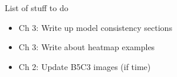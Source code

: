 
List of stuff to do

\begin{itemize}

\item Ch 3: Write up model consistency sections
\item Ch 3: Write about heatmap examples

\item Ch 2: Update B5C3 images (if time)

\end{itemize}
